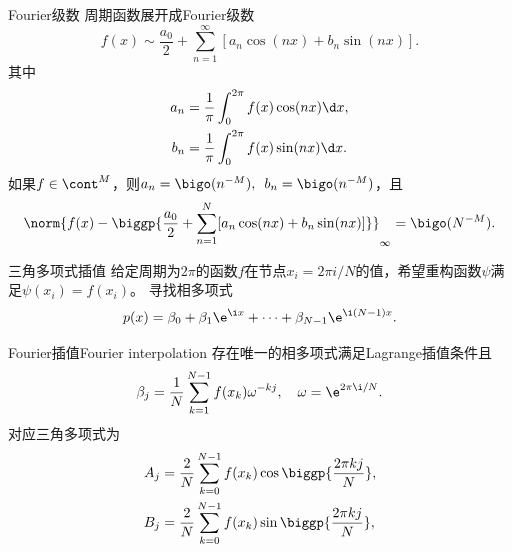 \begin{definition}
    {Fourier级数}{}
    周期函数展开成Fourier级数
    \begin{equation}
        f(x)\sim\frac{a_0}2+\sum_{n=1}^\infty[a_n\cos(nx)+b_n\sin(nx)].
    \end{equation}
    其中
    \begin{subequations}
        \begin{align}
            a_n&=\frac1\pi\int_0^{2\pi}f(x)\cos(nx)\d x,\\
            b_n&=\frac1\pi\int_0^{2\pi}f(x)\sin(nx)\d x.
        \end{align}
    \end{subequations}
    \tcblower
    如果$f\in\cont^M$，则$a_n=\bigo(n^{-M}),\enspace b_n=\bigo(n^{-M})$，且
    \[
        \norm{f(x)-\biggp{\frac{a_0}2+\sum_{n=1}^N[a_n\cos(nx)+b_n\sin(nx)]}}_\infty=\bigo(N^{-M}).
    \] 
\end{definition}

\begin{definition}
    {三角多项式插值}{}
    给定周期为$2\pi$的函数$f$在节点$x_i=2\pi i/N$的值，希望重构函数$\psi$满足$\psi(x_i)=f(x_i)$。
    \tcblower
    寻找相多项式
    \begin{equation}
        p(x)=\beta_0+\beta_1\e^{\i x}+\cdots+\beta_{N-1}\e^{\i(N-1)x}.
    \end{equation}
\end{definition}

\begin{theorem}
    {Fourier插值}{Fourier interpolation}
    存在唯一的相多项式满足Lagrange插值条件且
    \begin{equation}
        \label{eqn:Fourier betaj}
        \beta_j=\frac1N\sum_{k=1}^{N-1}f(x_k)\omega^{-kj},\quad\omega=\e^{2\pi\i/N}.
    \end{equation}
    对应三角多项式为
    \begin{subequations}
        \begin{align}
            A_j&=\frac2N\sum_{k=0}^{N-1}f(x_k)\cos\biggp{\frac{2\pi kj}N},\\
            B_j&=\frac2N\sum_{k=0}^{N-1}f(x_k)\sin\biggp{\frac{2\pi kj}N},
        \end{align}
    \end{subequations}
\end{theorem}





